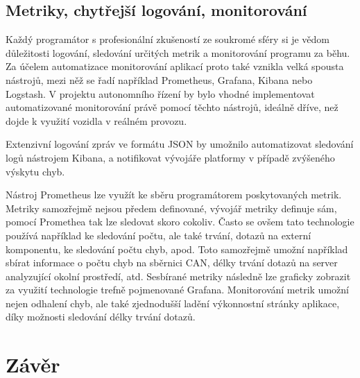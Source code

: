 \documentclass[czech, bachelor]{diploma}
\begin{document}
\section{Metriky, chytřejší logování, monitorování}

Každý programátor s profesionální zkušeností ze soukromé sféry si je vědom důležitosti logování, sledování určitých metrik
a monitorování programu za běhu. Za účelem automatizace monitorování aplikací proto také vznikla velká spousta nástrojů, mezi něž
se řadí například Prometheus, Grafana, Kibana nebo Logstash. V projektu autonomního řízení by bylo vhodné implementovat
automatizované monitorování právě pomocí těchto nástrojů, ideálně dříve, než dojde k využití vozidla v reálném provozu.

Extenzivní logování zpráv ve formátu JSON by umožnilo automatizovat sledování logů nástrojem Kibana, a notifikovat vývojáře
platformy v případě zvýšeného výskytu chyb.

Nástroj Prometheus lze využít ke sběru programátorem poskytovaných metrik. Metriky samozřejmě nejsou předem definované, vývojář
metriky definuje sám, pomocí Promethea tak lze sledovat skoro cokoliv. Často se ovšem tato technologie používá například
ke sledování počtu, ale také trvání, dotazů na externí komponentu, ke sledování počtu chyb, apod. Toto samozřejmě umožní například
sbírat informace o počtu chyb na sběrnici CAN, délky trvání dotazů na server analyzující okolní prostředí, atd. Sesbírané metriky
následně lze graficky zobrazit za využití technologie trefně pojmenované Grafana. Monitorování metrik umožní nejen odhalení chyb,
ale také zjednodušší ladění výkonnostní stránky aplikace, díky možnosti sledování délky trvání dotazů.

\chapter{Závěr}


\printbibliography[title={Literatura}, heading=bibintoc]

\appendix
% 
% 
\end{document}
